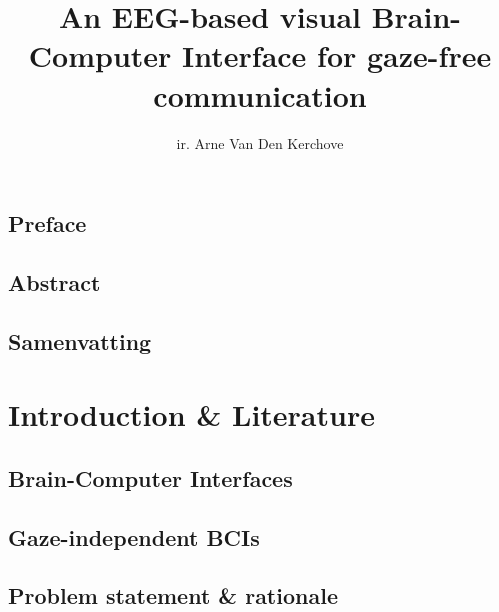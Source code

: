 %
\usepackage{todonotes}
\usepackage{lipsum}
\usepackage{hyperref}
\usepackage{tabularx}
\usepackage{booktabs}
\usepackage[inline]{enumitem}
\usepackage{subcaption}
\usepackage{algorithm}
\usepackage{algpseudocode}


\newcommand{\includechapter}[2]{
  \chapter{#1}
  \begin{refsection}
  
    \printbibliography[heading=subbibliography]
  \end{refsection}
  \clearpage
}

\usepackage[backend=biber]{biblatex}



\title{\sffamily An EEG-based visual Brain-Computer Interface for gaze-free communication}
\author{ir. Arne Van Den Kerchove}




\pagestyle{front}
\frontmatter

\chapter{Preface}
\lipsum[1]
\chapter{Abstract}
\lipsum[2-4]
\chapter{Samenvatting}
\lipsum[5-7]
\tableofcontents
\listoffigures
\listoftables



\mainmatter%
\pagestyle{main}


\part{Introduction \& Literature}
\includechapter{Brain-Computer Interfaces}{chapters/bci.tex}
\includechapter{Gaze-independent BCIs}{chapters/gaze_independence.tex}
\includechapter{Problem statement \& rationale}{chapters/problem_statement.tex}
